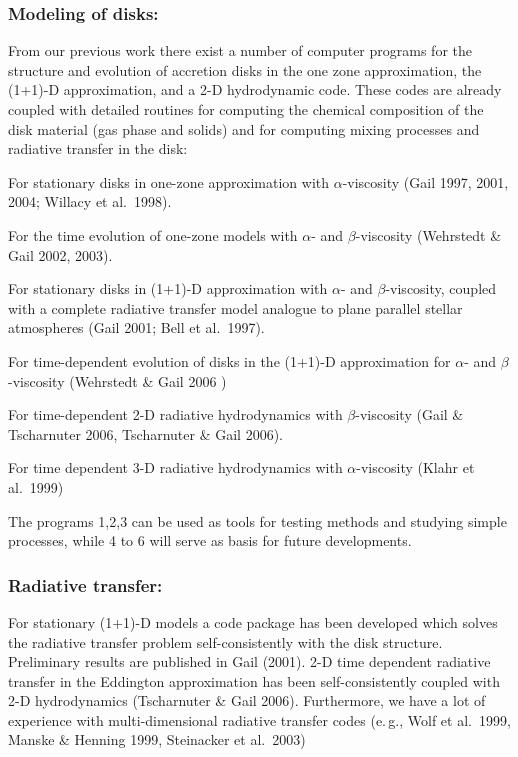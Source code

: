 \subsubsection{Modeling of disks:}
From our previous work there exist a number of computer programs for the
structure and evolution of accretion disks in the one zone approximation, the
(1+1)-D approximation, and a 2-D hydrodynamic code. These codes are already
coupled with detailed routines for computing the chemical composition of the
disk material (gas phase and solids) and for computing mixing processes and
radiative transfer in the disk:
\begin{compactitemize}
\item For stationary disks in one-zone approximation with $\alpha$-viscosity
(Gail 1997, 2001, 2004; Willacy et al.~1998).
\item For the time evolution of one-zone models with $\alpha$- and
$\beta$-viscosity (Wehrstedt \& Gail 2002, 2003).
\item For stationary disks in (1+1)-D approximation with $\alpha$-
and $\beta$-viscosity, coupled with a complete radiative transfer
model analogue to plane parallel stellar atmospheres (Gail 2001;
Bell et al.~1997).
\item For time-dependent evolution of disks in the (1+1)-D
approximation for $\alpha$- and $\beta$-viscosity (Wehrstedt \&
Gail 2006 )
\item For time-dependent 2-D radiative hydrodynamics with
$\beta$-viscosity (Gail \& Tscharnuter 2006, Tscharnuter \& Gail
2006).
\item For time dependent 3-D radiative hydrodynamics with $\alpha$-viscosity
(Klahr et al.~1999)
\end{compactitemize}
\noindent The programs 1,2,3 can be used as tools for testing methods 
and studying simple processes, while 4 to 6 will serve as basis for future
developments.


\subsubsection{Radiative transfer:} For stationary (1+1)-D models a code
package has been developed which solves the radiative transfer
problem self-consistently with the disk structure. Preliminary
results are published in Gail (2001). 2-D time dependent radiative
transfer in the Eddington approximation has been self-consistently
coupled with 2-D hydrodynamics (Tscharnuter \& Gail 2006).
Furthermore, we have a lot of experience with multi-dimensional
radiative transfer codes (e.\,g., Wolf et al.~1999, Manske \&
Henning 1999, Steinacker et al.~2003)

